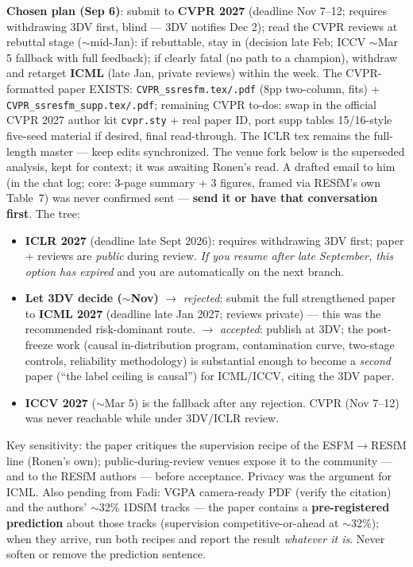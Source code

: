 \documentclass[11pt]{article}
\newcommand{\code}[1]{\texttt{\small #1}}
\begin{document}
\textbf{Chosen plan (Sep 6)}: submit to \textbf{CVPR 2027} (deadline Nov 7--12; requires
withdrawing 3DV first, blind --- 3DV notifies Dec 2); read the CVPR reviews at rebuttal
stage ($\sim$mid-Jan): if rebuttable, stay in (decision late Feb; ICCV $\sim$Mar 5
fallback with full feedback); if clearly fatal (no path to a champion), withdraw and
retarget \textbf{ICML} (late Jan, private reviews) within the week. The CVPR-formatted
paper EXISTS: \code{CVPR\_ssresfm.tex/.pdf} (8pp two-column, fits) +
\code{CVPR\_ssresfm\_supp.tex/.pdf}; remaining CVPR to-dos: swap in the official CVPR 2027
author kit \code{cvpr.sty} + real paper ID, port supp tables 15/16-style five-seed material
if desired, final read-through. The ICLR tex remains the full-length master --- keep edits
synchronized. The venue fork below is the superseded analysis, kept for context; it was
awaiting Ronen's read. A drafted email to him (in the chat log;
core: 3-page summary + 3 figures, framed via RESfM's own Table~7) was never confirmed sent —
\textbf{send it or have that conversation first}. The tree:

\begin{itemize}[leftmargin=1.4em,itemsep=2pt]
\item \textbf{ICLR 2027} (deadline late Sept 2026): requires withdrawing 3DV first; paper +
reviews are \emph{public} during review. \emph{If you resume after late September, this
option has expired} and you are automatically on the next branch.
\item \textbf{Let 3DV decide ($\sim$Nov)} $\rightarrow$ \emph{rejected}: submit the full
strengthened paper to \textbf{ICML 2027} (deadline late Jan 2027; reviews private) —
this was the recommended risk-dominant route. $\rightarrow$ \emph{accepted}: publish at 3DV;
the post-freeze work (causal in-distribution program, contamination curve, two-stage
controls, reliability methodology) is substantial enough to become a \emph{second} paper
(``the label ceiling is causal'') for ICML/ICCV, citing the 3DV paper.
\item \textbf{ICCV 2027} ($\sim$Mar 5) is the fallback after any rejection. CVPR (Nov 7--12)
was never reachable while under 3DV/ICLR review.
\end{itemize}

Key sensitivity: the paper critiques the supervision recipe of the ESFM$\rightarrow$RESfM line
(Ronen's own); public-during-review venues expose it to the community — and to the RESfM
authors — before acceptance. Privacy was the argument for ICML. Also pending from Fadi:
VGPA camera-ready PDF (verify the citation) and the authors' $\sim$32\% 1DSfM tracks — the
paper contains a \textbf{pre-registered prediction} about those tracks (supervision
competitive-or-ahead at $\sim$32\%); when they arrive, run both recipes and report the result
\emph{whatever it is}. Never soften or remove the prediction sentence.
\end{document}
